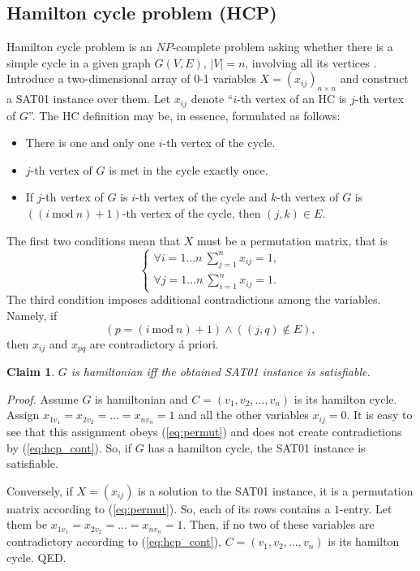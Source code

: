 \documentclass[11pt]{article}
\newtheorem{claim}{Claim}
\begin{document}
\subsection{Hamilton cycle problem (HCP)}
Hamilton cycle problem is an $NP$-complete problem asking whether there is a simple cycle in a given graph $G(V,E)$, $|V|=n$, involving all its vertices \cite{GJ79}. Introduce a two-dimensional array of 0-1 variables $X=(x_{ij})_{n \times n}$ and construct a SAT01 instance over them. Let $x_{ij}$ denote ``$i$-th vertex of an HC is $j$-th vertex of $G$''. The HC definition may be, in essence, formulated as follows:
\begin{itemize}
\item There is one and only one $i$-th vertex of the cycle.
\item $j$-th vertex of $G$ is met in the cycle exactly once.
\item If $j$-th vertex of $G$ is $i$-th vertex of the cycle and $k$-th vertex of $G$ is $((i \ \textrm{mod} \ n)+1)$-th vertex of the cycle, then $(j,k) \in E$.
\end{itemize}
The first two conditions mean that $X$ must be a permutation matrix, that is
\begin{equation}
\label{eq:permut}
\left\{ \begin{array}{l}
\forall i=1 \ldots n \ \sum_{j=1}^n x_{ij}=1, \\
\forall j=1 \ldots n \ \sum_{i=1}^n x_{ij}=1.
\end{array} \right.
\end{equation}
The third condition imposes additional contradictions among the variables. Namely, if
\begin{equation}
\label{eq:hcp_cont}
\left( p = (i \ \textrm{mod} \ n)+1 \right) \land \left( (j,q) \notin E \right),
\end{equation}
then $x_{ij}$ and $x_{pq}$ are contradictory \'a priori.
\begin{claim}
$G$ is hamiltonian iff the obtained SAT01 instance is satisfiable.
\end{claim}

{\em Proof.\/} Assume $G$ is hamiltonian and $C=(v_1,v_2,\ldots,v_n)$ is its hamilton cycle. Assign $x_{1v_1}=x_{2v_2}=\ldots=x_{nv_n}=1$ and all the other variables $x_{ij}=0$. It is easy to see that this assignment obeys (\ref{eq:permut}) and does not create contradictions by (\ref{eq:hcp_cont}). So, if $G$ has a hamilton cycle, the SAT01 instance is satisfiable.

Conversely, if $X=(x_{ij})$ is a solution to the SAT01 instance, it is a permutation matrix according to (\ref{eq:permut}). So, each of its rows contains a $1$-entry. Let them be $x_{1v_1}=x_{2v_2}=\ldots=x_{nv_n}=1$. Then, if no two of these variables are contradictory according to (\ref{eq:hcp_cont}), $C=(v_1,v_2,\ldots,v_n)$ is its hamilton cycle. QED.
\end{document}
